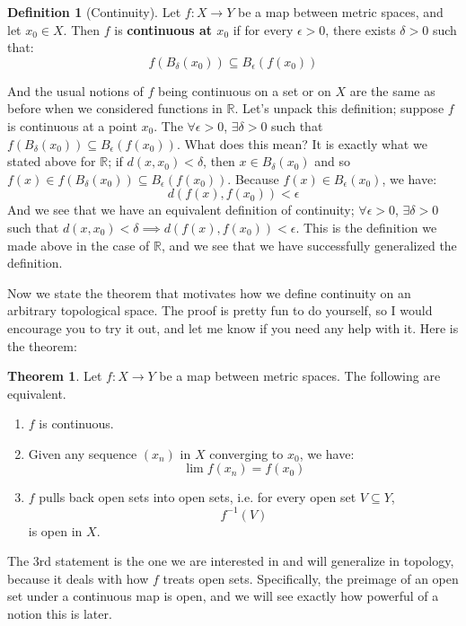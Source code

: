 \documentclass[11pt, oneside]{amsart}   	%
\theoremstyle{definition}
\newtheorem{definition}{Definition}[section]
\newtheorem{theorem}{Theorem}[section]
\begin{document}
	\begin{definition}[Continuity]
		Let $f : X\rightarrow Y$ be a map between metric spaces, and let $x_0\in X$. Then $f$ is \textbf{continuous at $x_0$} if for every $\epsilon > 0$, there 
		exists $\delta > 0$ such that:
		$$
			f(B_\delta(x_0))\subseteq B_\epsilon(f(x_0))
		$$
	\end{definition}
	
	And the usual notions of $f$ being continuous on a set or on $X$ are the same as before when we considered functions in $\mathbb R$. Let's unpack this 
	definition; suppose $f$ is continuous at a point $x_0$. The $\forall\epsilon > 0$, $\exists\delta > 0$ such that $f(B_\delta(x_0))\subseteq B_\epsilon(f(x_0))$. 
	What does this mean? It is exactly what we stated above for $\mathbb R$; if $d(x, x_0) < \delta$, then $x\in B_\delta(x_0)$ and so $f(x)\in f(B_\delta(x_0))
	\subseteq B_\epsilon(f(x_0))$. Because $f(x)\in B_\epsilon(x_0)$, we have:
	$$
		d(f(x), f(x_0)) < \epsilon
	$$
	And we see that we have an equivalent definition of continuity; $\forall\epsilon > 0$, $\exists\delta > 0$ such that $d(x, x_0) < \delta\implies d(f(x), f(x_0)) < 
	\epsilon$. This is the definition we made above in the case of $\mathbb R$, and we see that we have successfully generalized the definition.
	
	Now we state the theorem that motivates how we define continuity on an arbitrary topological space. The proof is pretty fun to do yourself, so I would 
	encourage you to try it out, and let me know if you need any help with it. Here is the theorem:
	
	\begin{theorem}
		Let $f : X\rightarrow Y$ be a map between metric spaces. The following are equivalent.
		\begin{enumerate}
			\item $f$ is continuous.
			\item Given any sequence $(x_n)$ in $X$ converging to $x_0$, we have:
			$$
				\lim f(x_n) = f(x_0)
			$$
			\item $f$ pulls back open sets into open sets, i.e. for every open set $V\subseteq Y$, 
			$$
				f^{-1}(V)
			$$
			is open in $X$.
		\end{enumerate}
	\end{theorem}
	
	The 3rd statement is the one we are interested in and will generalize in topology, because it deals with how $f$ treats open sets. Specifically, the preimage 
	of an open set under a continuous map is open, and we will see exactly how powerful of a notion this is later.
	
\end{document}
